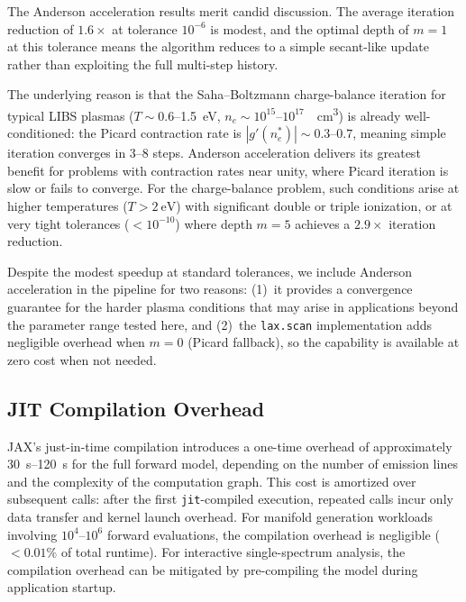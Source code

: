 \documentclass[preprint,12pt,authoryear]{elsarticle}
\begin{document}
The Anderson acceleration results merit candid discussion.
The average iteration reduction of $1.6\times$ at tolerance $10^{-6}$ is modest,
and the optimal depth of $m = 1$ at this tolerance means the algorithm reduces to a simple secant-like update rather than exploiting the full multi-step history.

The underlying reason is that the Saha--Boltzmann charge-balance iteration for typical LIBS plasmas ($T \sim 0.6$--\SI{1.5}{\electronvolt}, $n_e \sim 10^{15}$--$10^{17}$~\si{\per\cubic\centi\metre}) is already well-conditioned: the Picard contraction rate is $|g'(n_e^*)| \sim 0.3$--$0.7$, meaning simple iteration converges in 3--8 steps.
Anderson acceleration delivers its greatest benefit for problems with contraction rates near unity, where Picard iteration is slow or fails to converge.
For the charge-balance problem, such conditions arise at higher temperatures ($T > \SI{2}{\electronvolt}$) with significant double or triple ionization, or at very tight tolerances ($< 10^{-10}$) where depth $m = 5$ achieves a $2.9\times$ iteration reduction.

Despite the modest speedup at standard tolerances, we include Anderson acceleration in the pipeline for two reasons: (1)~it provides a convergence guarantee for the harder plasma conditions that may arise in applications beyond the parameter range tested here, and (2)~the \texttt{lax.scan} implementation adds negligible overhead when $m = 0$ (Picard fallback), so the capability is available at zero cost when not needed.

\subsection{JIT Compilation Overhead}

JAX's just-in-time compilation introduces a one-time overhead of approximately \SIrange{30}{120}{\second} for the full forward model, depending on the number of emission lines and the complexity of the computation graph.
This cost is amortized over subsequent calls: after the first \texttt{jit}-compiled execution, repeated calls incur only data transfer and kernel launch overhead.
For manifold generation workloads involving $10^4$--$10^6$ forward evaluations, the compilation overhead is negligible ($< 0.01\%$ of total runtime).
For interactive single-spectrum analysis, the compilation overhead can be mitigated by pre-compiling the model during application startup.
\end{document}

